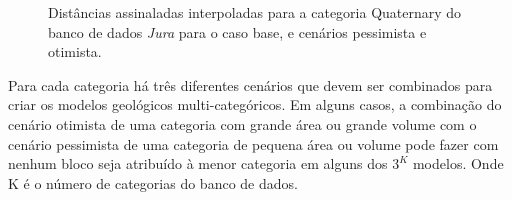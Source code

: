 \begin{figure}[H] 
    \centering
    \caption{Distâncias assinaladas interpoladas para a categoria Quaternary do banco de dados \textit{Jura} para o caso base, e cenários pessimista e otimista.} \label{quater_param}
     \hspace{1em}
     \hspace{1em}
\end{figure}

Para cada categoria há três diferentes cenários que devem ser combinados para criar os modelos geológicos multi-categóricos. Em alguns casos, a combinação do cenário otimista de uma categoria com grande área ou grande volume com o cenário pessimista de uma categoria de pequena área ou volume pode fazer com nenhum bloco seja atribuído à menor categoria em alguns dos $3^K$ modelos. Onde K é o número de categorias do banco de dados.  

